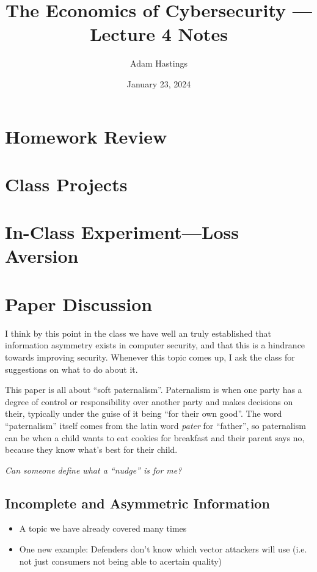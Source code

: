 \documentclass[11pt]{article}
\title{The Economics of Cybersecurity --- Lecture 4 Notes}
\date{January 23, 2024}
\author{Adam Hastings}
\begin{document}
\maketitle

\section{Homework Review}

\section{Class Projects}

\section{In-Class Experiment---Loss Aversion}

\section{Paper Discussion}

I think by this point in the class we have well an truly established that information asymmetry exists in computer security, and that this is a hindrance towards improving security.
Whenever this topic comes up, I ask the class for suggestions on what to do about it. 

This paper is all about ``soft paternalism''. Paternalism is when one party has a degree of control or responsibility over another party and makes decisions on their, typically under the guise of it being ``for their own good''.
The word ``paternalism'' itself comes from the latin word {\it pater} for ``father'', so paternalism can be when a child wants to eat cookies for breakfast and their parent says no, because they know what's best for their child.




{\it Can someone define what a ``nudge'' is for me?}

\subsection{Incomplete and Asymmetric Information}
\begin{itemize}
    \item A topic we have already covered many times
    \item One new example: Defenders don't know which vector attackers will use (i.e. not just consumers not being able to acertain quality)
\end{itemize}
\end{document}
